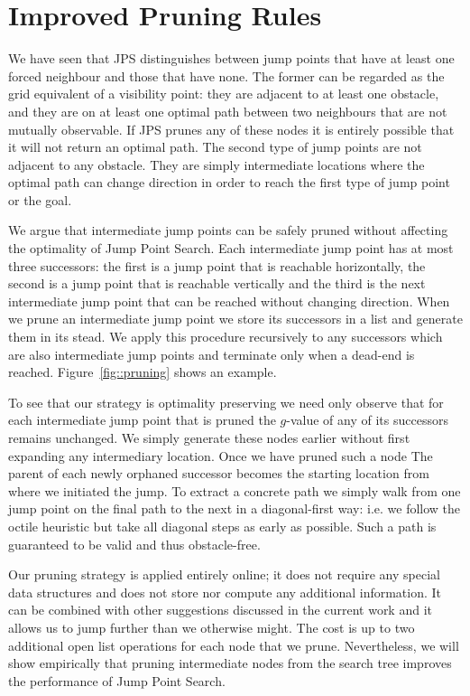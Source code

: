 \section{Improved Pruning Rules}
\label{sec::pruning}
We have seen that JPS distinguishes between jump points that have at least 
one forced neighbour and those that have none.
The former can be regarded as
the grid equivalent of a visibility point: they are adjacent to at least one
obstacle, and they are on at least one optimal path between two neighbours
that are not mutually observable. If JPS prunes any of these nodes it is
entirely possible that it will not return an optimal path.  The second type of
jump points are not adjacent to any obstacle. They are simply intermediate
locations where the optimal path can change direction in order to reach the
first type of jump point or the goal.
\par
We argue that intermediate jump points can be safely pruned without
affecting the optimality of Jump Point Search.  
Each intermediate jump point has at most three successors: the first is a jump 
point that is reachable horizontally, the second is a jump point that is reachable 
vertically and the third is the next intermediate jump point that can be reached 
without changing direction.
When we prune an intermediate jump point we store its successors in a list and
generate them in its stead. We apply this procedure recursively to any
successors which are also intermediate jump points and terminate only when a
dead-end is reached. Figure~\ref{fig::pruning} shows an example.

To see that our strategy is optimality preserving we need only observe that
for each intermediate jump point that is pruned the $g$-value of any of its
successors remains unchanged. We simply generate these nodes earlier without
first expanding any intermediary location.  Once we have pruned such a node 
The parent of each newly orphaned successor becomes the starting location from
where we initiated the jump. To extract a concrete path we simply walk from
one jump point on the final path to the next in a diagonal-first way: i.e. we
follow the octile heuristic but take all diagonal steps as early as possible.
Such a path is guaranteed to be valid and thus obstacle-free.

Our pruning strategy is applied entirely online; it does not require any
special data structures and does not store nor compute any additional
information.  It can be combined with other suggestions discussed in the 
current work and it allows us to jump further than we otherwise might. The 
cost is up to two additional open list operations for each node that we
prune. Nevertheless, we will show empirically that pruning intermediate nodes
from the search tree improves the performance of Jump Point Search.

